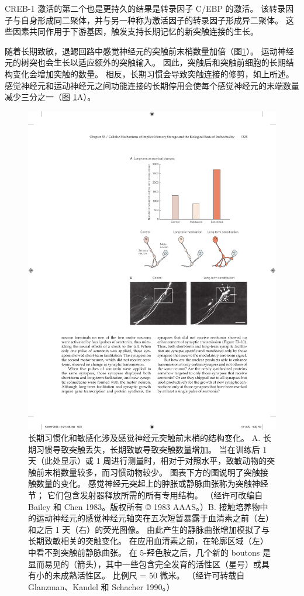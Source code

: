 CREB-1 激活的第二个也是更持久的结果是转录因子 C/EBP 的激活。 该转录因子与自身形成同二聚体，并与另一种称为激活因子的转录因子形成异二聚体。 这些因素共同作用于下游基因，触发支持长期记忆的新突触连接的生长。

随着长期致敏，退鳃回路中感觉神经元的突触前末梢数量加倍（图\ref{fig:53_9}）。 运动神经元的树突也会生长以适应额外的突触输入。 因此，突触后和突触前细胞的长期结构变化会增加突触的数量。 相反，长期习惯会导致突触连接的修剪，如上所述。 感觉神经元和运动神经元之间功能连接的长期停用会使每个感觉神经元的末端数量减少三分之一（图 \ref{fig:53_9}A）。

\begin{figure}[htbp]
	\centering
	\includegraphics[width=0.7\linewidth]{chap53/fig_53_9}
	\caption{长期习惯化和敏感化涉及感觉神经元突触前末梢的结构变化。 A. 长期习惯导致突触丢失，长期致敏导致突触数量增加。 当在训练后 1 天（此处显示）或 1 周进行测量时，相对于对照水平，致敏动物的突触前末梢数量较多，而习惯动物较少。 图表下方的图说明了突触接触数量的变化。 感觉神经元突起上的肿胀或静脉曲张称为突触神经节； 它们包含发射器释放所需的所有专用结构。 （经许可改编自 Bailey 和 Chen 1983。版权所有 © 1983 AAAS。）B. 接触培养物中的运动神经元的感觉神经元轴突在五次短暂暴露于血清素之前（左）和之后 1 天（右）的荧光图像。 由此产生的静脉曲张增加模拟了与长期致敏相关的突触变化。 在应用血清素之前，在轮廓区域（左）中看不到突触前静脉曲张。 在 5-羟色胺之后，几个新的 boutons 是显而易见的（箭头），其中一些包含完全发育的活性区（星号）或具有小的未成熟活性区。 比例尺 = 50 微米。 （经许可转载自 Glanzman、Kandel 和 Schacher 1990。）}
	\label{fig:53_9}
\end{figure}



